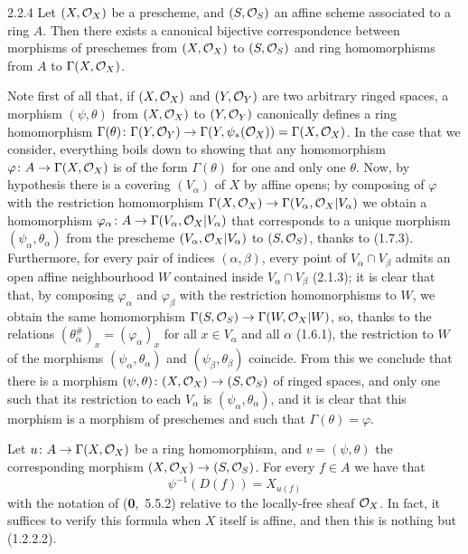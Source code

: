 \documentclass[../main.tex]{subfiles}
\begin{document}
\begin{cx}[Proposition]{2.2.4}
    Let $(X,\mathcal{O}_X)$ be a prescheme, and $(S,\mathcal{O}_S)$ an affine scheme associated to a ring $A$.
    Then there exists a canonical bijective correspondence between morphisms of preschemes from $(X,\mathcal{O}_X)$ to $(S,\mathcal{O}_S)$ and ring homomorphisms from $A$ to $\Gamma(X,\mathcal{O}_X)$.
\end{cx}
Note first of all that, if $(X,\mathcal{O}_X)$ and $(Y,\mathcal{O}_Y)$ are two arbitrary ringed spaces, a morphism $(\psi,\theta)$ from $(X,\mathcal{O}_X)$ to $(Y,\mathcal{O}_Y)$ canonically defines a ring homomorphism $\Gamma(\theta)\colon\Gamma(Y,\mathcal{O}_Y)\to\Gamma(Y,\psi_*(\mathcal{O}_X))=\Gamma(X,\mathcal{O}_X)$.
In the case that we consider, everything boils down to showing that any homomorphism $\varphi\colon A\to\Gamma(X,\mathcal{O}_X)$ is of the form $\Gamma(\theta)$ for one and only one $\theta$.
Now, by hypothesis there is a covering $(V_\alpha)$ of $X$ by affine opens; by composing of $\varphi$ with the restriction homomorphism $\Gamma(X,\mathcal{O}_X)\to\Gamma(V_\alpha,\mathcal{O}_X|V_\alpha)$ we obtain a homomorphism $\varphi_\alpha\colon A\to\Gamma(V_\alpha,\mathcal{O}_X|V_\alpha)$ that corresponds to a unique morphism $(\psi_\alpha,\theta_\alpha)$ from the prescheme $(V_\alpha,\mathcal{O}_X|V_\alpha)$ to $(S,\mathcal{O}_S)$, thanks to (1.7.3).
Furthermore, for every pair of indices $(\alpha,\beta)$, every point of $V_\alpha\cap V_\beta$ admits an open affine neighbourhood $W$ contained inside $V_\alpha\cap V_\beta$ (2.1.3); it is clear that that, by composing $\varphi_\alpha$ and $\varphi_\beta$ with the restriction homomorphisms to $W$, we obtain the same homomorphism $\Gamma(S,\mathcal{O}_S)\to\Gamma(W,\mathcal{O}_X|W)$, so, thanks to the relations $(\theta_\alpha^\#)_x=(\varphi_\alpha)_x$ for all $x\in V_\alpha$ and all $\alpha$ (1.6.1), the restriction to $W$ of the morphisms $(\psi_\alpha,\theta_\alpha)$ and $(\psi_\beta,\theta_\beta)$ coincide.
From this we conclude that there is a morphism $(\psi,\theta)\colon(X,\mathcal{O}_X)\to(S,\mathcal{O}_S)$ of ringed spaces, and only one such that its restriction to each $V_\alpha$ is $(\psi_\alpha,\theta_\alpha)$, and it is clear that this morphism is a morphism of preschemes and such that $\Gamma(\theta)=\varphi$.

Let $u\colon A\to\Gamma(X,\mathcal{O}_X)$ be a ring homomorphism, and $v=(\psi,\theta)$ the corresponding morphism $(X,\mathcal{O}_X)\to(S,\mathcal{O}_S)$.
For every $f\in A$ we have that
\begin{equation*}
    \psi^{-1}(D(f))=X_{u(f)}\tag{2.2.4.1}
\end{equation*}
with the notation of (\textbf{0},~5.5.2) relative to the locally-free sheaf $\mathcal{O}_X$.
In fact, it suffices to verify this formula when $X$ itself is affine, and then this is nothing but (1.2.2.2).
\end{document}
